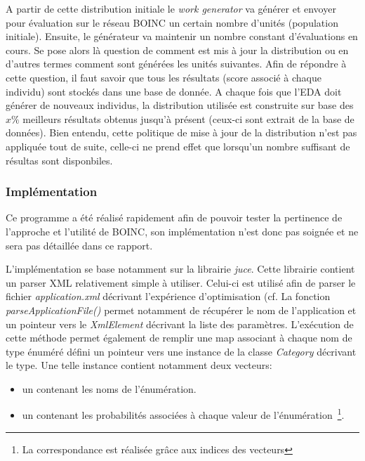 \documentclass[a4paper, 11pt]{article}
\begin{document}
A partir de cette distribution initiale le \textit{work generator} va générer et envoyer pour évaluation sur le réseau \textsc{BOINC} un certain nombre d'unités (population initiale). Ensuite, le générateur va maintenir un nombre constant d'évaluations en cours. Se pose alors là question de comment est mis à jour la distribution ou en d'autres termes comment sont générées les unités suivantes. Afin de répondre à cette question, il faut savoir que tous les résultats (score associé à chaque individu) sont stockés dans une base de donnée. A chaque fois que l'EDA doit générer de nouveaux individus, la distribution utilisée est construite sur base des $x\%$ meilleurs résultats obtenus jusqu'à présent (ceux-ci sont extrait de la base de données). Bien entendu, cette politique de mise à jour de la distribution n'est pas appliquée tout de suite, celle-ci ne prend effet que lorsqu'un nombre suffisant de résultas sont disponbiles.

\subsubsection{Implémentation}
Ce programme a été réalisé rapidement afin de pouvoir tester la pertinence de l'approche et l'utilité de \textsc{BOINC}, son implémentation n'est donc pas soignée et ne sera pas détaillée dans ce rapport.

L'implémentation se base notamment sur la librairie \textit{juce}. Cette librairie contient un parser XML relativement simple à utiliser. Celui-ci est utilisé afin de parser le fichier \textit{application.xml} décrivant l'expérience d'optimisation (cf. %
La fonction \textit{parseApplicationFile()} permet notamment de récupérer le nom de l'application et un pointeur vers le \textit{XmlElement} décrivant la liste des paramètres. L'exécution de cette méthode permet également de remplir une map associant à chaque nom de type énuméré défini un pointeur vers une instance de la classe \textit{Category} décrivant le type. Une telle instance contient notamment deux vecteurs:
\begin{itemize}
\item un contenant les noms de l'énumération.
\item un contenant les probabilités associées à chaque valeur de l'énumération~\footnote{La correspondance est réalisée grâce aux indices des vecteurs}.
\end{itemize}
\end{document}
